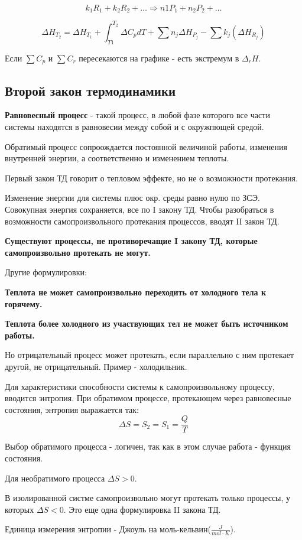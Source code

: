 \documentclass[11pt]{article}
\begin{document}
$$k_1R_1+k_2R_2+\ldots \Rightarrow n1P_1 + n_2P_2 + \ldots$$

$$\Delta H_{T_2} = \Delta H_{T_1} + \int _{T1} ^{T_2}\Delta C_p dT + \sum n_j\Delta H_{P_j} - \sum k_j(\Delta H_{R_j})$$

Если $\sum C_p$ и $\sum C_r$ пересекаются на графике - есть экстремум в $\Delta_rH$. 

\subsection{Второй закон термодинамики}
\textbf{Равновесный процесс} - такой процесс, в любой фазе которого все части системы находятся в равновесии между собой и с окружпющей средой.

Обратимый процесс сопроождается постоянной величиной работы, изменения внутренней энергии, а соответственно и изменением теплоты.

Первый закон ТД говорит о тепловом эффекте, но не о возможности протекания.

Изменение энергии для системы плюс окр. среды равно нулю по ЗСЭ. Совокупная энергия сохраняется, все по I закону ТД. Чтобы разобраться в возможности самопроизвольного протекания процессов, вводят II закон ТД.

\textbf{Существуют процессы, не противоречащие I закону ТД, которые самопроизвольно протекать не могут.}

Другие формулировки:

\textbf{Теплота не может самопроизвольно переходить от холодного тела к горячему.}

\textbf{Теплота более холодного из участвующих тел не может быть источником работы.}

Но отрицательный процесс может протекать, если параллельно с ним протекает другой, не отрицательный. Пример - холодильник.

Для характеристики способности системы к самопроизвольному процессу, вводится энтропия. При обратимом процессе, протекающем через равновесные состояния, энтропия выражается так:
$$\Delta S = S_2 = S_1 = \frac QT$$

Выбор обратимого процесса - логичен, так как в этом случае работа - функция состояния. 

Для необратимого процесса $\Delta S >0$. 

В изолированной систме самопроизвольно могут протекать только процессы, у которых $\Delta S<0$. Это еще одна формулировка II закона ТД.

Единица измерения энтропии - Джоуль на моль-кельвин($\frac J{mol\cdot K}$).
\end{document}
